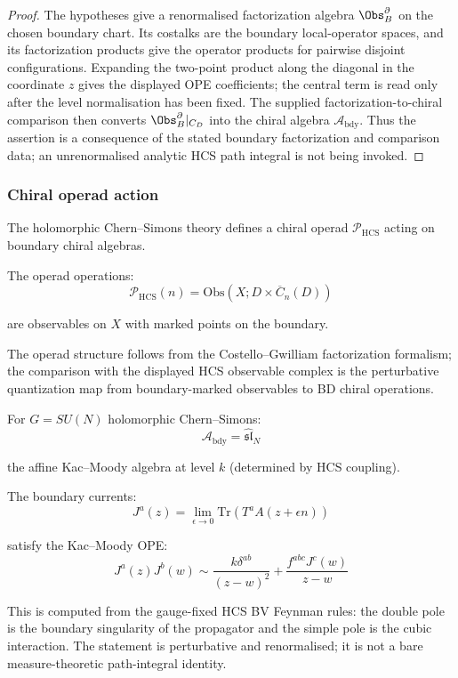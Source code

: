 \begin{proof}
The hypotheses give a renormalised factorization algebra
\(\Obs^\partial_B\) on the chosen boundary chart.  Its costalks are the
boundary local-operator spaces, and its factorization products give the
operator products for pairwise disjoint configurations.  Expanding the
two-point product along the diagonal in the coordinate \(z\) gives the
displayed OPE coefficients; the central term is read only after the
level normalisation has been fixed.  The supplied
factorization-to-chiral comparison then converts
\(\Obs^\partial_B|_{C_D}\) into the chiral algebra
\(\mathcal{A}_{\text{bdy}}\).  Thus the assertion is a consequence of
the stated boundary factorization and comparison data; an
unrenormalised analytic HCS path integral is not being invoked.
\end{proof}

\subsubsection{Chiral operad action}

\begin{remark}
\label{rem:chiral-operad-hcs}
The holomorphic Chern--Simons theory defines a chiral operad $\mathcal{P}_{\text{HCS}}$
acting on boundary chiral algebras.

The operad operations:
\[\mathcal{P}_{\text{HCS}}(n) = \text{Obs}(X; D \times \overline{C}_n(D))\]

are observables on $X$ with marked points on the boundary.
\end{remark}

\begin{remark}
The operad structure follows from the Costello--Gwilliam factorization
formalism; the comparison with the displayed HCS observable complex is
the perturbative quantization map from boundary-marked observables to
BD chiral operations.
\end{remark}

\begin{example}
For $G = SU(N)$ holomorphic Chern--Simons:
\[\mathcal{A}_{\text{bdy}} = \widehat{\mathfrak{sl}}_N\]

the affine Kac--Moody algebra at level $k$ (determined by HCS coupling).

The boundary currents:
\[J^a(z) = \lim_{\epsilon \to 0} \text{Tr}(T^a A(z + \epsilon n))\]

satisfy the Kac--Moody OPE:
\[J^a(z) J^b(w) \sim \frac{k \delta^{ab}}{(z-w)^2} +
\frac{f^{abc} J^c(w)}{z-w}\]

This is computed from the gauge-fixed HCS BV Feynman rules: the
double pole is the boundary singularity of the propagator and the
simple pole is the cubic interaction.  The statement is perturbative
and renormalised; it is not a bare measure-theoretic path-integral
identity.
\end{example}

